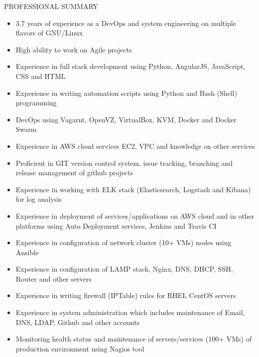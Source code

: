 \documentclass{resume} %
\begin{document}
\begin{rSection}{PROFESSIONAL SUMMARY}
  
  \begin{itemize}
    
  \item 3.7 years of experience as a DevOps and system engineering on
    multiple flavors of GNU/Linux

  \item High ability to work on Agile projects

  \item Experience in full stack development using Python, AngularJS,
    JavaScript, CSS and HTML

  \item Experience in writing automation scripts using
    Python and Bash (Shell) programming

  \item DevOps using Vagarnt, OpenVZ, VirtualBox, KVM,
    Docker and Docker Swarm

  \item Experience in AWS cloud services EC2, VPC and knowledge on
    other services

  \item Proficient in GIT version control system, issue tracking,
    branching and release management of github projects

  \item Experience in working with ELK stack (Elasticsearch, Logstash
    and Kibana) for log analysis
    
  \item Experience in deployment of services/applications on AWS cloud
    and in other platforms using Auto Deployment services, Jenkins and
    Travis CI

  \item Experience in configuration of network cluster (10+ VMs)
    nodes using Ansible
    
  \item Experience in configuration of LAMP stack,
    Nginx, DNS, DHCP, SSH, Router and other servers

  \item Experience in writing firewall (IPTable) rules for
    RHEL CentOS servers

  \item Experience in system administration which includes maintenance
    of Email, DNS, LDAP, Github and other accounts

  \item Monitoring health status and maintenance of servers/services
    (100+ VMs) of production environment using Nagios tool


\end{itemize}
\end{rSection}
\end{document}
